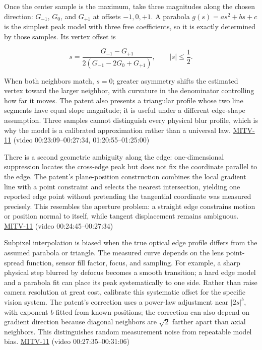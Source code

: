 Once the center sample is the maximum, take three magnitudes along the chosen direction: \(G_{-1}\), \(G_0\), and \(G_{+1}\) at offsets \(-1,0,+1\). A parabola \(g(s)=as^2+bs+c\) is the simplest peak model with three free coefficients, so it is exactly determined by those samples. Its vertex offset is

\[
s=\frac{G_{-1}-G_{+1}}{2(G_{-1}-2G_0+G_{+1})},\qquad |s|\le\frac12.
\]

When both neighbors match, \(s=0\); greater asymmetry shifts the estimated vertex toward the larger neighbor, with curvature in the denominator controlling how far it moves. The patent also presents a triangular profile whose two line segments have equal slope magnitude; it is useful under a different edge-shape assumption. Three samples cannot distinguish every physical blur profile, which is why the model is a calibrated approximation rather than a universal law. \hyperref[04-visual-computing-ii-ch036-mitv-11---edge-detection-subpixel-position-cordic-line-detection-us-6408109]{MITV-11} (video 00:23:09--00:27:34, 01:20:55--01:25:00)

There is a second geometric ambiguity along the edge: one-dimensional suppression locates the cross-edge peak but does not fix the coordinate parallel to the edge. The patent's plane-position construction combines the local gradient line with a point constraint and selects the nearest intersection, yielding one reported edge point without pretending the tangential coordinate was measured precisely. This resembles the aperture problem: a straight edge constrains motion or position normal to itself, while tangent displacement remains ambiguous. \hyperref[04-visual-computing-ii-ch036-mitv-11---edge-detection-subpixel-position-cordic-line-detection-us-6408109]{MITV-11} (video 00:24:45--00:27:34)

Subpixel interpolation is biased when the true optical edge profile differs from the assumed parabola or triangle. The measured curve depends on the lens point-spread function, sensor fill factor, focus, and sampling. For example, a sharp physical step blurred by defocus becomes a smooth transition; a hard edge model and a parabola fit can place its peak systematically to one side. Rather than raise camera resolution at great cost, calibrate this systematic offset for the specific vision system. The patent's correction uses a power-law adjustment near \(|2s|^b\), with exponent \(b\) fitted from known positions; the correction can also depend on gradient direction because diagonal neighbors are \(\sqrt2\) farther apart than axial neighbors. This distinguishes random measurement noise from repeatable model bias. \hyperref[04-visual-computing-ii-ch036-mitv-11---edge-detection-subpixel-position-cordic-line-detection-us-6408109]{MITV-11} (video 00:27:35--00:31:06)

